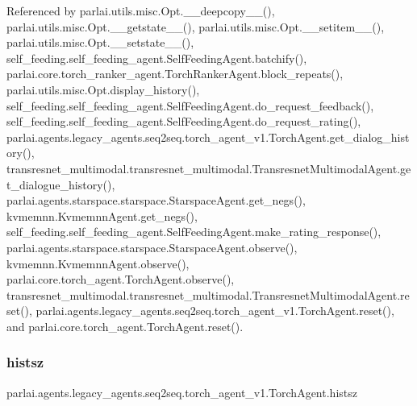 Referenced by parlai.\+utils.\+misc.\+Opt.\+\_\+\+\_\+deepcopy\+\_\+\+\_\+(), parlai.\+utils.\+misc.\+Opt.\+\_\+\+\_\+getstate\+\_\+\+\_\+(), parlai.\+utils.\+misc.\+Opt.\+\_\+\+\_\+setitem\+\_\+\+\_\+(), parlai.\+utils.\+misc.\+Opt.\+\_\+\+\_\+setstate\+\_\+\+\_\+(), self\+\_\+feeding.\+self\+\_\+feeding\+\_\+agent.\+Self\+Feeding\+Agent.\+batchify(), parlai.\+core.\+torch\+\_\+ranker\+\_\+agent.\+Torch\+Ranker\+Agent.\+block\+\_\+repeats(), parlai.\+utils.\+misc.\+Opt.\+display\+\_\+history(), self\+\_\+feeding.\+self\+\_\+feeding\+\_\+agent.\+Self\+Feeding\+Agent.\+do\+\_\+request\+\_\+feedback(), self\+\_\+feeding.\+self\+\_\+feeding\+\_\+agent.\+Self\+Feeding\+Agent.\+do\+\_\+request\+\_\+rating(), parlai.\+agents.\+legacy\+\_\+agents.\+seq2seq.\+torch\+\_\+agent\+\_\+v1.\+Torch\+Agent.\+get\+\_\+dialog\+\_\+history(), transresnet\+\_\+multimodal.\+transresnet\+\_\+multimodal.\+Transresnet\+Multimodal\+Agent.\+get\+\_\+dialogue\+\_\+history(), parlai.\+agents.\+starspace.\+starspace.\+Starspace\+Agent.\+get\+\_\+negs(), kvmemnn.\+Kvmemnn\+Agent.\+get\+\_\+negs(), self\+\_\+feeding.\+self\+\_\+feeding\+\_\+agent.\+Self\+Feeding\+Agent.\+make\+\_\+rating\+\_\+response(), parlai.\+agents.\+starspace.\+starspace.\+Starspace\+Agent.\+observe(), kvmemnn.\+Kvmemnn\+Agent.\+observe(), parlai.\+core.\+torch\+\_\+agent.\+Torch\+Agent.\+observe(), transresnet\+\_\+multimodal.\+transresnet\+\_\+multimodal.\+Transresnet\+Multimodal\+Agent.\+reset(), parlai.\+agents.\+legacy\+\_\+agents.\+seq2seq.\+torch\+\_\+agent\+\_\+v1.\+Torch\+Agent.\+reset(), and parlai.\+core.\+torch\+\_\+agent.\+Torch\+Agent.\+reset().

\mbox{\label{classparlai_1_1agents_1_1legacy__agents_1_1seq2seq_1_1torch__agent__v1_1_1TorchAgent_add94f2eee8d2a4aba14869587e9dd4d3}} 
\subsubsection{\texorpdfstring{histsz}{histsz}}
{\footnotesize\ttfamily parlai.\+agents.\+legacy\+\_\+agents.\+seq2seq.\+torch\+\_\+agent\+\_\+v1.\+Torch\+Agent.\+histsz}



